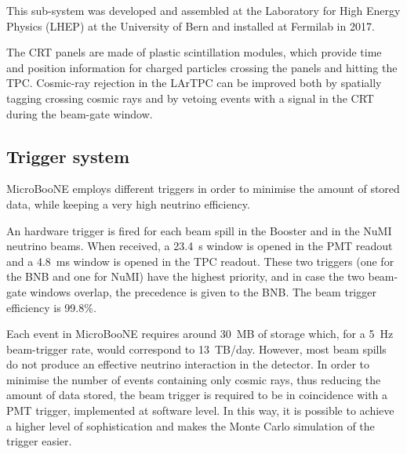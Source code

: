 This sub-system was developed and assembled at the Laboratory for High Energy Physics (LHEP) at the University of Bern and installed at Fermilab in 2017. 

The CRT panels are made of plastic scintillation modules, which provide time and position information for charged particles crossing the panels and hitting the TPC.
Cosmic-ray rejection in the LArTPC can be improved both by spatially tagging crossing cosmic rays and by vetoing events with a signal in the CRT during the beam-gate window. 

\subsection{Trigger system}\label{sec:trigger}
MicroBooNE employs different triggers in order to minimise the amount of stored data, while keeping a very high neutrino efficiency.

An hardware trigger is fired for each beam spill in the Booster and in the NuMI neutrino beams. When received, a 23.4~\si{\micro}s window is opened in the PMT readout and a 4.8~ms window is opened in the TPC readout. These two triggers (one for the BNB and one for NuMI) have the highest priority, and in case the two beam-gate windows overlap, the precedence is given to the BNB. The beam trigger efficiency is 99.8\%.

Each event in MicroBooNE requires around 30~MB of storage which, for a 5~Hz beam-trigger rate, would correspond to 13~TB/day. However, most beam spills do not produce an effective neutrino interaction in the detector. In order to minimise the number of events containing only cosmic rays, thus reducing the amount of data stored, the beam trigger is required to be in coincidence with a PMT trigger, implemented at software level. In this way, it is possible to achieve a higher level of sophistication and makes the Monte Carlo simulation of the trigger easier. 

